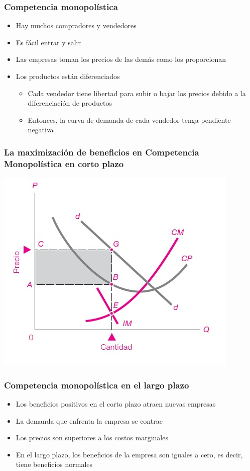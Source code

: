 \documentclass{beamer}
\begin{document}
\begin{frame}
\frametitle{ Competencia monopolística}
\begin{itemize}
    \item Hay muchos compradores y vendedores
    \item Es fácil entrar y salir
    \item Las empresas toman los precios de las demás como los proporcionan
    \item Los productos están diferenciados
    \begin{itemize}
        \item Cada vendedor tiene libertad para subir o bajar los precios debido a la diferenciación de productos
        \item Entonces, la curva de demanda de cada vendedor tenga pendiente negativa
    \end{itemize}
    \end{itemize}
\end{frame}

\begin{frame}
\frametitle{ La maximización de beneficios en Competencia Monopolística en corto plazo}
\centering
\includegraphics[scale=0.75]{Figures/Tema_08.01_compmonop.jpg}
\end{frame}

\begin{frame}
\frametitle{ Competencia monopolística en el largo plazo}
\begin{itemize}
    \item Los beneficios positivos en el corto plazo atraen nuevas empresas
    \item La demanda que enfrenta la empresa se contrae
    \item Los precios son superiores a los costos marginales
    \item En el largo plazo, los beneficios de la empresa son iguales a cero, es decir, tiene beneficios normales 
\end{itemize}
\end{frame}
\end{document}

